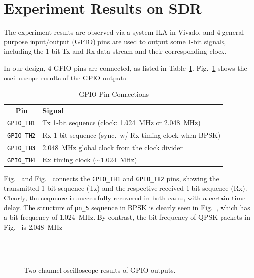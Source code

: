 \documentclass[journal,twoside]{IEEEtran}
\newcommand{\tabvertspace}{\specialrule{0em}{0.08em}{.08em}}
\begin{document}
  \section{Experiment Results on SDR}

    The experiment results are observed via a system ILA in Vivado,
    and 4 general-purpose input/output (GPIO) pins are used to output some 1-bit signals,
    including the 1-bit Tx and Rx data stream and their corresponding clock.

    In our design, 4 GPIO pins are connected, as listed in Table~\ref{tab:gpio_pins}.
    Fig.~\ref{fig:scope} shows the oscilloscope results of the GPIO outputs.
    \begin{table}[htbp]
      \caption{GPIO Pin Connections}
      \label{tab:gpio_pins}
      \renewcommand{\arraystretch}{1.2}
      \begin{tabularx}{\linewidth}{cX}
        \toprule\tabvertspace
        \textbf{Pin} & \textbf{Signal} \\
        \tabvertspace\midrule
        \texttt{GPIO\_TH1} & Tx 1-bit sequence (clock: \qty{1.024}{MHz} or \qty{2.048}{MHz}) \\
        \texttt{GPIO\_TH2} & Rx 1-bit sequence (sync.\ w/ Rx timing clock when BPSK) \\
        \texttt{GPIO\_TH3} & \qty{2.048}{MHz} global clock from the clock divider \\
        \texttt{GPIO\_TH4} & Rx timing clock ($\sim$\qty{1.024}{MHz}) \\
        \bottomrule
      \end{tabularx}
    \end{table}

    Fig.~ and Fig.~
    connects the \texttt{GPIO\_TH1} and \texttt{GPIO\_TH2} pins,
    showing the transmitted 1-bit sequence (Tx) and the respective received 1-bit sequence (Rx).
    Clearly, the sequence is successfully recovered in both cases, with a certain time delay.
    The structure of \texttt{pn\_5} sequence in BPSK is clearly seen in Fig.~,
    which has a bit frequency of \qty{1.024}{MHz}.
    By contrast, the bit frequency of QPSK packets in Fig.~ is \qty{2.048}{MHz}.



    \begin{figure}[t]
      \centering
      \\
      \\
      \caption{Two-channel oscilloscope results of GPIO outputs.}
      \label{fig:scope}
    \end{figure}
\end{document}
